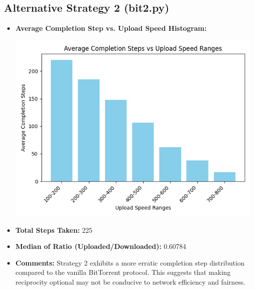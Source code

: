 \documentclass{article}
\begin{document}
\subsection{Alternative Strategy 2 (bit2.py)}
\begin{itemize}
\item \textbf{Average Completion Step vs. Upload Speed Histogram:} 

\includegraphics[width=\linewidth]{graphs/bit2.png}
\item \textbf{Total Steps Taken:} 225
\item \textbf{Median of Ratio (Uploaded/Downloaded):} 0.60784
\item \textbf{Comments:} Strategy 2 exhibits a more erratic completion step distribution compared to the vanilla BitTorrent protocol. This suggests that making reciprocity optional may not be conducive to network efficiency and fairness.
\end{itemize}

\newpage
\end{document}
